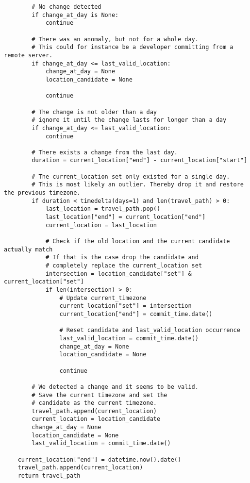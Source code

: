 \begin{verbatim}
        # No change detected
        if change_at_day is None:
            continue

        # There was an anomaly, but not for a whole day.
        # This could for instance be a developer committing from a remote server.
        if change_at_day <= last_valid_location:
            change_at_day = None
            location_candidate = None

            continue

        # The change is not older than a day
        # ignore it until the change lasts for longer than a day
        if change_at_day <= last_valid_location:
            continue

        # There exists a change from the last day.
        duration = current_location["end"] - current_location["start"]

        # The current_location set only existed for a single day.
        # This is most likely an outlier. Thereby drop it and restore the previous timezone.
        if duration < timedelta(days=1) and len(travel_path) > 0:
            last_location = travel_path.pop()
            last_location["end"] = current_location["end"]
            current_location = last_location

            # Check if the old location and the current candidate actually match
            # If that is the case drop the candidate and
            # completely replace the current_location set
            intersection = location_candidate["set"] & current_location["set"]
            if len(intersection) > 0:
                # Update current_timezone
                current_location["set"] = intersection
                current_location["end"] = commit_time.date()

                # Reset candidate and last_valid_location occurrence
                last_valid_location = commit_time.date()
                change_at_day = None
                location_candidate = None

                continue

        # We detected a change and it seems to be valid.
        # Save the current timezone and set the
        # candidate as the current timezone.
        travel_path.append(current_location)
        current_location = location_candidate
        change_at_day = None
        location_candidate = None
        last_valid_location = commit_time.date()

    current_location["end"] = datetime.now().date()
    travel_path.append(current_location)
    return travel_path
\end{verbatim}
\begingroup
{}\label{lst:travel-analysis}
\endgroup

